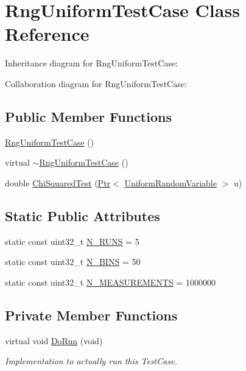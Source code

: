 \hypertarget{classRngUniformTestCase}{}\section{Rng\+Uniform\+Test\+Case Class Reference}
\label{classRngUniformTestCase}


Inheritance diagram for Rng\+Uniform\+Test\+Case\+:


Collaboration diagram for Rng\+Uniform\+Test\+Case\+:
\subsection*{Public Member Functions}
\begin{DoxyCompactItemize}
\item 
\hyperlink{classRngUniformTestCase_a99f3ece5ba62917cc121389632fbbfd4}{Rng\+Uniform\+Test\+Case} ()
\item 
virtual \hyperlink{classRngUniformTestCase_ab3665649e6de021c4afda22a1b8d6449}{$\sim$\+Rng\+Uniform\+Test\+Case} ()
\item 
double \hyperlink{classRngUniformTestCase_a0b3ff4e75ad18f37e50a601c145f88ff}{Chi\+Squared\+Test} (\hyperlink{classns3_1_1Ptr}{Ptr}$<$ \hyperlink{classns3_1_1UniformRandomVariable}{Uniform\+Random\+Variable} $>$ u)
\end{DoxyCompactItemize}
\subsection*{Static Public Attributes}
\begin{DoxyCompactItemize}
\item 
static const uint32\+\_\+t \hyperlink{classRngUniformTestCase_a8e497dbf81e4a701e28039e280be27d6}{N\+\_\+\+R\+U\+NS} = 5
\item 
static const uint32\+\_\+t \hyperlink{classRngUniformTestCase_a7cd2b3c08e99885890ee016351b72a18}{N\+\_\+\+B\+I\+NS} = 50
\item 
static const uint32\+\_\+t \hyperlink{classRngUniformTestCase_a1b87c0bce87620bf39e371bf5782abe8}{N\+\_\+\+M\+E\+A\+S\+U\+R\+E\+M\+E\+N\+TS} = 1000000
\end{DoxyCompactItemize}
\subsection*{Private Member Functions}
\begin{DoxyCompactItemize}
\item 
virtual void \hyperlink{classRngUniformTestCase_a4b13df62fbfbc583caa61b5f9d32fd05}{Do\+Run} (void)
\begin{DoxyCompactList}\small\item\em Implementation to actually run this Test\+Case. \end{DoxyCompactList}\end{DoxyCompactItemize}
